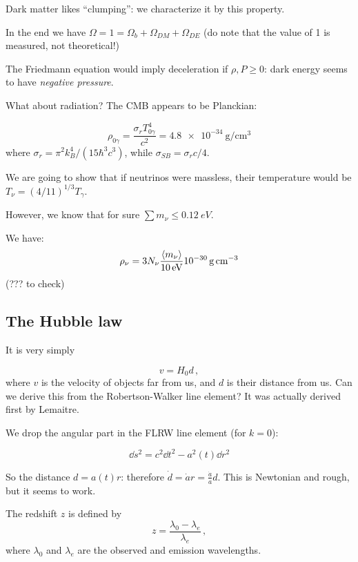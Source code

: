 \documentclass[main.tex]{subfiles}
\begin{document}
Dark matter likes ``clumping'': we characterize it by this property.

In the end we have \(\Omega = 1 = \Omega_b + \Omega_{DM} + \Omega_{DE}\) (do note that the value of 1 is measured, not theoretical!)

The Friedmann equation would imply deceleration if \(\rho, P \geq 0\): dark energy seems to have \emph{negative pressure}.

What about radiation? The CMB appears to be Planckian:

\begin{equation}
  \rho_{0 \gamma} = \frac{\sigma_r T_{0 \gamma}^4}{c^2} = \SI{4.8e-34}{\gram\per\centi\metre\cubed}
\end{equation}
%
where \(\sigma_r = \pi^2 k_B^4 / (15 \hbar ^3 c^3)\), while \(\sigma_{SB} = \sigma_r c /4\).

We are going to show that if neutrinos were massless, their temperature would be \(T_\nu = (4/11)^{1/3} T_\gamma\).

However, we know that for sure \(\sum m_\nu \leq \SI{0.12}{eV} \).

We have:
%
\begin{equation}
  \rho_\nu = 3 N_\nu \frac{\expval{m_\nu} }{\SI{10}{eV}} \SI{e-30}{\gram\per\cubic\centi\metre}
\end{equation}
(??? to check)

\subsection{The Hubble law}

It is very simply

\begin{equation}
  v = H_0 d\,,
\end{equation}
%
where \(v\) is the velocity of objects far from us, and \(d\) is their distance from us. Can we derive this from the Robertson-Walker line element?
It was actually derived first by Lemaitre.

We drop the angular part in the FLRW line element (for \(k = 0\)):

\begin{equation}
  \dd{s^2} = c^2 \dd{t^2} - a^2(t) \dd{r^2}
\end{equation}

So the distance \(d = a(t) r\): therefore \(\dot{d} = \dot{a}r = \frac{\dot{a} }{a} d\).   This is Newtonian and rough, but it seems to work.

\begin{definition}[Redshift]
    The redshift \(z\) is defined by
    \begin{equation}
      z = \frac{\lambda_0 - \lambda_e}{\lambda_{e}}\,,
    \end{equation}
    where \(\lambda_0\) and \(\lambda_e\) are the observed and emission wavelengths.
\end{definition}
\end{document}
